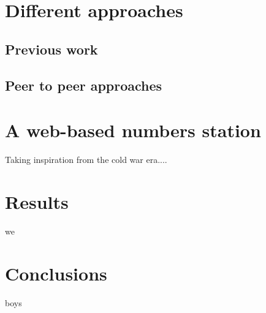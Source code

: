 \documentclass[10pt]{article}
\begin{document}
\section{Different approaches}\label{sec:2}

\subsection{Previous work}

\subsection{Peer to peer approaches}

\section{A web-based numbers station}

Taking inspiration from the cold war era....


\section{Results}\label{sec:3}
we

\section{Conclusions}\label{sec:4}
boys

\newpage
\end{document}
